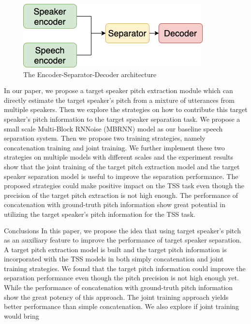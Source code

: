 \documentclass[final]{beamer}
\newlength{\colwidth}
\begin{document}
\begin{frame}[t]
\begin{columns}[t]
\begin{column}{\colwidth}
\begin{block}{}
                    \begin{figure}[!t]
                        \centering
                        \includegraphics[width=0.58\linewidth]{img/encoder_sep_decoder}
                        \caption{The Encoder-Separator-Decoder architecture}
                        \label{fig:enc_sep_doc_arc}
                    \end{figure}

                    In our paper, we propose a target speaker pitch extraction module which can directly estimate the target speaker's pitch from a mixture of utterances from multiple speakers.
                    Then we explore the strategies on how to contribute this target speaker's pitch information to the target speaker separation task.
                    We propose a small scale Multi-Block RNNoise (MBRNN) model as our baseline speech separation system.
                    Then we propose two training strategies, namely concatenation training and joint training.
                    We further implement these two strategies on multiple models with different scales and the experiment results show that the joint training of the target pitch extraction model and the target speaker separation model is useful to improve the separation performance.
                    The proposed strategies could make positive impact on the TSS task even though the precision of the target pitch extraction is not high enough.
                    The performance of concatenation with ground-truth pitch information show great potential in utilizing the target speaker's pitch information for the TSS task.
                \end{block}

                \begin{block}{Conclusions}
                    In this paper, we propose the idea that using target speaker's pitch as an auxiliary feature to improve the performance of target speaker separation. A target pitch extraction model is built and the target pitch information is incorporated with the TSS models in both simply concatenation and joint training strategies. We found that the target pitch information could improve the separation performance even though the pitch precision is not high enough yet. While the performance of concatenation with ground-truth pitch information show the great potency of this approach. The joint training approach yields better performance than simple concatenation. We also explore if joint training would bring
                \end{block}
            \end{column}


\end{columns}
\end{frame}
\end{document}
